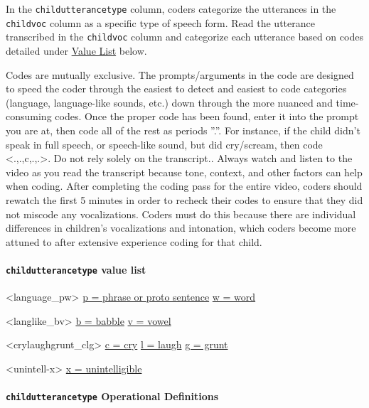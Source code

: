 \documentclass[
]{book}
\begin{document}
In the \texttt{childutterancetype} column, coders categorize the utterances in the \texttt{childvoc} column as a specific type of speech form. Read the utterance transcribed in the \texttt{childvoc} column and categorize each utterance based on codes detailed under \protect\hyperlink{childutterancetype_val_list}{Value List} below.

Codes are mutually exclusive. The prompts/arguments in the code are designed to speed the coder through the easiest to detect and easiest to code categories (language, language-like sounds, etc.) down through the more nuanced and time-consuming codes. Once the proper code has been found, enter it into the prompt you are at, then code all of the rest as periods ''.''. For instance, if the child didn't speak in full speech, or speech-like sound, but did cry/scream, then code \textless.,.,c,.,.\textgreater.
Do not rely solely on the transcript.. Always watch and listen to the video as you read the transcript because tone, context, and other factors can help when coding.
After completing the coding pass for the entire video, coders should rewatch the first 5 minutes in order to recheck their codes to ensure that they did not miscode any vocalizations. Coders must do this because there are individual differences in children's vocalizations and intonation, which coders become more attuned to after extensive experience coding for that child.

\hypertarget{childutterancetype_val_list}{%
\paragraph*{\texorpdfstring{\texttt{childutterancetype} value list}{childutterancetype value list}}\label{childutterancetype_val_list}}

\textless language\_pw\textgreater{}
\protect\hyperlink{phrase_proto_sentence}{p = phrase or proto sentence}
\protect\hyperlink{word}{w = word}

\textless langlike\_bv\textgreater{}
\protect\hyperlink{babble}{b = babble}
\protect\hyperlink{vowel}{v = vowel}

\textless crylaughgrunt\_clg\textgreater{}
\protect\hyperlink{cry}{c = cry}
\protect\hyperlink{laugh}{l = laugh}
\protect\hyperlink{grunt_guttural}{g = grunt}

\textless unintell-x\textgreater{}
\protect\hyperlink{unintelligible_child}{x = unintelligible}

\hypertarget{childutterancetype-operational-definitions}{%
\paragraph*{\texorpdfstring{\texttt{childutterancetype} Operational Definitions}{childutterancetype Operational Definitions}}\label{childutterancetype-operational-definitions}}
\end{document}
